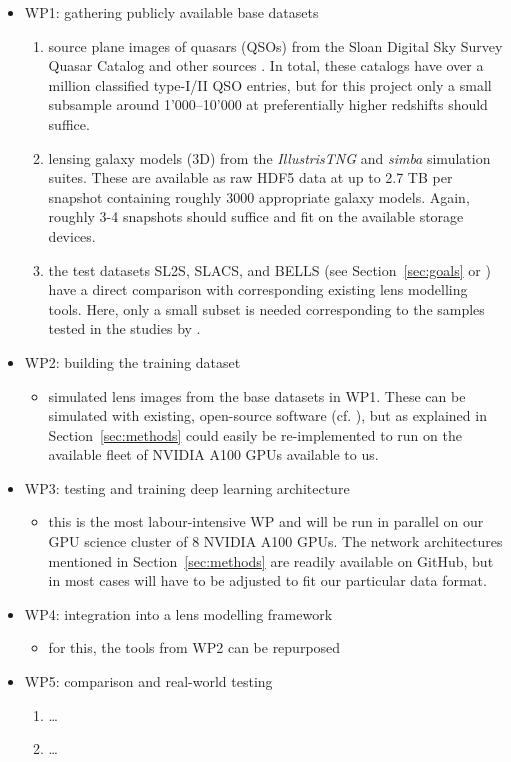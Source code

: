 \documentclass[a4paper,10pt]{article}
\begin{document}
\begin{itemize}
\item WP1: gathering publicly available base datasets
\begin{enumerate}
\item source plane images of quasars (QSOs) from the Sloan Digital Sky
Survey Quasar Catalog \citep{Schneider10,Paris18} and other
sources \citep{Flesch21}. In total, these catalogs have over a
million classified type-I/II QSO entries, but for this project
only a small subsample around 1'000--10'000 at preferentially
higher redshifts should suffice.
\item lensing galaxy models (3D) from the \emph{IllustrisTNG}
\citep{Nelson18} and \emph{simba} \citep{Dave19} simulation
suites.  These are available as raw HDF5 data at up to 2.7 TB per
snapshot containing roughly 3000 appropriate galaxy models. Again,
roughly 3-4 snapshots should suffice and fit on the available
storage devices.
\item the test datasets SL2S, SLACS, and BELLS (see
Section~\ref{sec:goals} or
\cite{Gavazzi12,Bolton2006,Brownstein11}) have a direct
comparison with corresponding existing lens modelling tools. Here,
only a small subset is needed corresponding to the samples tested
in the studies by
\cite{Adam22,Denzel21,Morningstar19,Hezaveh17}.
\end{enumerate}
\item WP2: building the training dataset
\begin{itemize}
\item simulated lens images from the base datasets in WP1. These can be
simulated with existing, open-source software
(cf. \cite{Hezaveh17,Birrer18}), but as explained in
Section~\ref{sec:methods} could easily be re-implemented
to run on the available fleet of NVIDIA A100 GPUs available to us.
\end{itemize}
\item WP3: testing and training deep learning architecture
\begin{itemize}
\item this is the most labour-intensive WP and will be run in parallel
on our GPU science cluster of 8 NVIDIA A100 GPUs. The network
architectures mentioned in Section~\ref{sec:methods} are
readily available on GitHub, but in most cases will have to be
adjusted to fit our particular data format.
\end{itemize}
\item WP4: integration into a lens modelling framework
\begin{itemize}
\item for this, the tools from WP2 can be repurposed
\end{itemize}
\item WP5: comparison and real-world testing
\begin{enumerate}
\item \ldots{}
\item \ldots{}
\end{enumerate}
\end{itemize}
\end{document}
